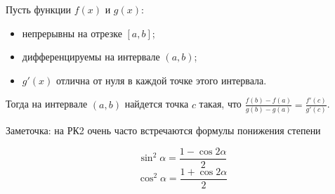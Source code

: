 Пусть функции $f(x)$ и $g(x)$:
\begin{itemize}
    \item непрерывны на отрезке $[a,b]$;
    \item дифференцируемы на интервале $(a,b)$;
    \item $g'(x)$ отлична от нуля в каждой точке этого интервала. 
\end{itemize}

Тогда на интервале $(a, b)$ найдется точка $c$ такая, что $\frac{f(b)-f(a)}{g(b)-g(a)} = \frac{f'(c)}{g'(c)}$.

\vspace*{45pt}

\begin{myquote}
Заметочка: на РК2 очень часто встречаются формулы понижения степени

$$\sin^2\alpha = \frac{1 - \cos2\alpha}{2}$$
$$\cos^2\alpha = \frac{1 + \cos2\alpha}{2}$$
\end{myquote}


\newpage
\let\clearpage\relax




